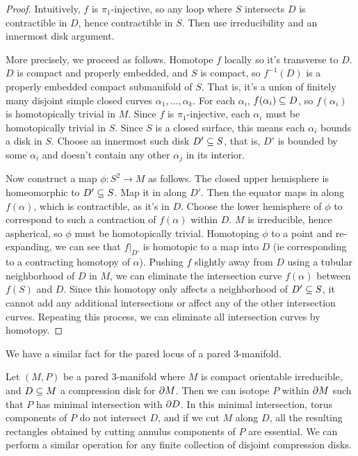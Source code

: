 \begin{proof}

Intuitively, $f$ is $\pi_1$-injective, so any loop where $S$ intersects $D$ is
contractible in $D$, hence contractible in $S$. Then use irreducibility and an
innermost disk argument.

More precisely, we proceed as follows. Homotope $f$ locally so it's transverse
to $D$. $D$ is compact and properly embedded, and $S$ is compact, so
$f^{-1}(D)$ is a properly embedded compact submanifold of $S$. That is, it's
a union of finitely many disjoint simple closed curves
$\alpha_1,\dots,\alpha_k$.  For each $\alpha_i$, $f(\alpha_i) \subseteq D$, so
$f(\alpha_i)$ is homotopically trivial in $M$.  Since $f$ is $\pi_1$-injective,
each $\alpha_i$ must be homotopically trivial in $S$.  Since $S$ is a closed
surface, this means each $\alpha_i$ bounds a disk in $S$.  Choose an innermost
such disk $D' \subseteq S$, that is, $D'$ is bounded by some $\alpha_i$ and doesn't
contain any other $\alpha_j$ in its interior.

Now construct a map $\phi \colon S^2 \to M$ as follows. The closed upper
hemisphere is homeomorphic to $D' \subseteq S$. Map it in along $D'$. Then the
equator maps in along $f(\alpha)$, which is contractible, as it's in $D$.
Choose the lower hemisphere of $\phi$ to correspond to such a contraction of
$f(\alpha)$ within $D$.  $M$ is irreducible, hence aspherical, so $\phi$ must
be homotopically trivial.  Homotoping $\phi$ to a point and re-expanding, we
can see that $f|_{D'}$ is homotopic to a map into $D$ (ie corresponding to
a contracting homotopy of $\alpha$). Pushing $f$ slightly away from $D$ using
a tubular neighborhood of $D$ in $M$, we can eliminate the intersection curve
$f(\alpha)$ between $f(S)$ and $D$.  Since this homotopy only affects
a neighborhood of $D' \subseteq S$, it cannot add any additional intersections or
affect any of the other intersection curves.  Repeating this process, we can
eliminate all intersection curves by homotopy.

\end{proof}

We have a similar fact for the pared locus of a pared 3-manifold.

\begin{prop}\label{P:pared1}

Let $(M,P)$ be a pared 3-manifold where $M$ is compact orientable irreducible,
and $D \subseteq M$ a compression disk for $\partial M$. Then we can isotope $P$ within
$\partial M$ such that $P$ has minimal intersection with $\partial D$. In this minimal
intersection, torus components of $P$ do not intersect $D$, and if we cut $M$
along $D$, all the resulting rectangles obtained by cutting annulus components
of $P$ are essential.  We can perform a similar operation for any finite
collection of disjoint compression disks.

\end{prop}

